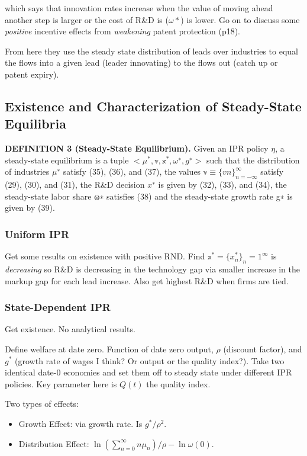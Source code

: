 \documentclass[11pt]{article}
\begin{document}
  which says that innovation rates increase when the value of moving ahead another step is larger or the cost of R\&D is ($\omega*$) is lower.  Go on to discuss some \emph{positive} incentive effects from \emph{weakening} patent protection (p18).

  From here they use the steady state distribution of leads over industries to equal the flows into a given lead (leader innovating) to the flows out (catch up or patent expiry).


\subsection{Existence and Characterization of Steady-State Equilibria}
\label{sub:existence_and_characterization_of_steady_state_equilibria}
  
  \textbf{DEFINITION 3 (Steady-State Equilibrium).} Given an IPR policy $\eta$, a steady-state equilibrium is a tuple $<\mathbb{\mu}^*, \mathbb{v}, \mathbb{x}^*, \omega^∗, g^∗>$ such that the distribution of industries $\mu^∗$ satisfy (35), (36), and (37), the values $\mathbb{v} \equiv \{vn\}_{n=-\infty}^{\infty}$ satisfy (29), (30), and (31), the R\&D decision $x^∗$ is given by (32), (33), and (34), the steady-state labor share ω∗ satisfies (38) and the steady-state growth rate g∗ is given by (39).


  \subsubsection{Uniform IPR}
  \label{subsub:uniform_ipr}
    Get some results on existence with positive RND.  Find $\mathbb{x}^* = \{x_n^*\}_n=1^{\infty}$ is \emph{decreasing} so R\&D is decreasing in the technology gap via smaller increase in the markup gap for each lead increase.  Also get highest R\&D when firms are tied.

  \subsubsection{State-Dependent IPR}
  \label{state_dependent_ipr}
    Get existence. No analytical results.

    Define welfare at date zero.  Function of date zero output, $\rho$ (discount factor), and $g^*$ (growth rate of wages I think? Or output or the quality index?). Take two identical date-0 economies and set them off to steady state under different IPR policies.  Key parameter here is $Q(t)$ the quality index.

    Two types of effects:
    \begin{itemize}
      \item Growth Effect: via growth rate.  Is $g^*/\rho^2$.
      \item Distribution Effect: $\ln(\sum_{n=0}^{\infty} n\mu_n)/\rho - \ln\omega(0)$.
    \end{itemize}
\end{document}

